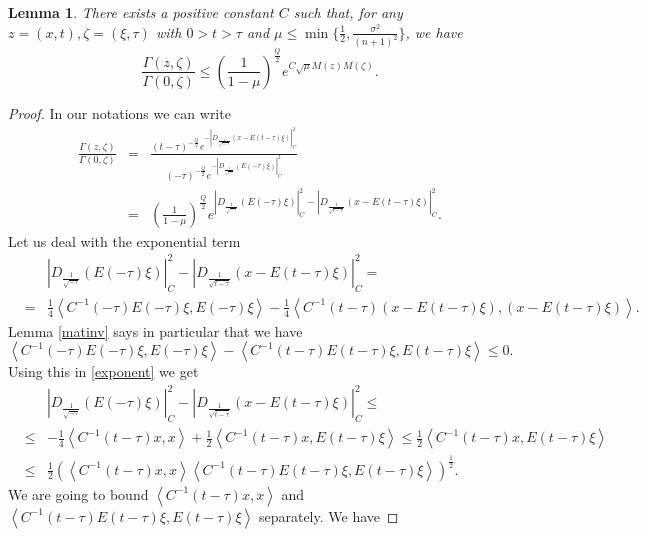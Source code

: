 \documentclass[10pt]{amsart}
\newtheorem{lemma}[theorem]{Lemma}
\numberwithin{equation}{section}
\begin{document}
\begin{lemma}\label{rapporto}
There exists a positive constant $C$ such that, for any $z=(x,t),\zeta=(\xi,\tau)$ with $0>t>\tau$ and $\mu\leq\min{\{\frac{1}{2},\frac{\sigma^2}{(n+1)^2}\}}$, we have
$$\frac{\Gamma(z,\zeta)}{\Gamma(0,\zeta)}\leq\left(\frac{1}{1-\mu}\right)^{\frac{Q}{2}}e^{C\sqrt{\mu}M(z)M(\zeta)}.$$
\end{lemma}
\begin{proof} In our notations we can write
\begin{eqnarray*}
\frac{\Gamma(z,\zeta)}{\Gamma(0,\zeta)}&=&\frac{(t-\tau)^{-\frac{Q}{2}}e^{-\left|D_{\frac{1}{\sqrt{t-\tau}}}\left(x-E(t-\tau)\xi\right)\right|_C^2}}{(-\tau)^{-\frac{Q}{2}}e^{-\left|D_{\frac{1}{\sqrt{-\tau}}}\left(E(-\tau)\xi\right)\right|_C^2}}\\
&=&\left(\frac{1}{1-\mu}\right)^{\frac{Q}{2}}e^{\left|D_{\frac{1}{\sqrt{-\tau}}}\left(E(-\tau)\xi\right)\right|_C^2-\left|D_{\frac{1}{\sqrt{t-\tau}}}\left(x-E(t-\tau)\xi\right)\right|_C^2}.
\end{eqnarray*}
Let us deal with the exponential term
\begin{eqnarray}\label{exponent}
&&\left|D_{\frac{1}{\sqrt{-\tau}}}\left(E(-\tau)\xi\right)\right|_C^2-\left|D_{\frac{1}{\sqrt{t-\tau}}}\left(x-E(t-\tau)\xi\right) \right|_C^2=\\
&=&\frac{1}{4}\left\langle C^{-1}(-\tau)E(-\tau)\xi,E(-\tau)\xi\right\rangle-\frac{1}{4}\left\langle C^{-1}(t-\tau)\left(x-E(t-\tau)\xi\right),\left(x-E(t-\tau)\xi\right)\right\rangle.\nonumber
\end{eqnarray}
Lemma \ref{matinv} says in particular that we have
$$\left\langle C^{-1}(-\tau)E(-\tau)\xi,E(-\tau)\xi\right\rangle-\left\langle C^{-1}(t-\tau) E(t-\tau)\xi,E(t-\tau)\xi\right\rangle\leq 0.$$
Using this in \eqref{exponent} we get
\begin{eqnarray}\label{exponent2}
&&\left|D_{\frac{1}{\sqrt{-\tau}}}\left(E(-\tau)\xi\right)\right|_C^2-\left|D_{\frac{1}{\sqrt{t-\tau}}}\left(x-E(t-\tau)\xi\right) \right|_C^2\leq\\
&\leq&-\frac{1}{4}\left\langle C^{-1}(t-\tau)x,x\right\rangle+\frac{1}{2}\left\langle C^{-1}(t-\tau)x,E(t-\tau)\xi\right\rangle\leq\frac{1}{2}\left\langle C^{-1}(t-\tau)x,E(t-\tau)\xi\right\rangle\nonumber\\
&\leq&\frac{1}{2}\left(\left\langle C^{-1}(t-\tau)x,x\right\rangle\left\langle C^{-1}(t-\tau)E(t-\tau)\xi,E(t-\tau)\xi\right\rangle\right)^{\frac{1}{2}}.\nonumber
\end{eqnarray}
We are going to bound $\left\langle C^{-1}(t-\tau)x,x\right\rangle$ and $\left\langle C^{-1}(t-\tau)E(t-\tau)\xi,E(t-\tau)\xi\right\rangle$ separately. We have

\end{proof}
\end{document}
